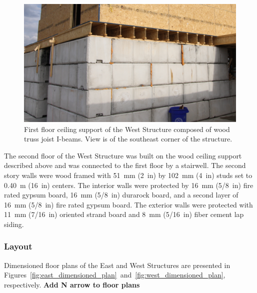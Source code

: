 \documentclass[12pt,oneside]{book}
\begin{document}
\begin{figure}[!ht]
	\includegraphics[width=\columnwidth]{../Figures/Pictures/TJI_support}
	\caption[TJI-constructed ceiling support of the West Structure.]{First floor ceiling support of the West Structure composed of wood truss joist I-beams. View is of the southeast corner of the structure.}
	\label{fig:TJI}
\end{figure}
\FloatBarrier

The second floor of the West Structure was built on the wood ceiling support described above and was connected to the first floor by a stairwell. The second story walls were wood framed with 51~mm (2~in) by 102~mm (4~in) studs set to 0.40~m (16~in) centers. The interior walls were protected by 16~mm (5/8~in) fire rated gypsum board, 16~mm (5/8~in) durarock board, and a second layer of 16~mm (5/8~in) fire rated gypsum board. The exterior walls were protected with 11~mm (7/16~in) oriented strand board and 8~mm (5/16~in) fiber cement lap siding.

\subsubsection{Layout}
\label{sec:layout}
Dimensioned floor plans of the East and West Structures are presented in Figures~\ref{fig:east_dimensioned_plan}~and~\ref{fig:west_dimensioned_plan}, respectively. \textbf{Add N arrow to floor plans}
\end{document}
